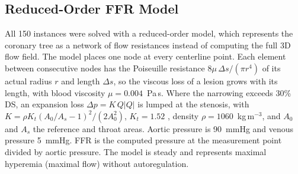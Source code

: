\documentclass[journal,twoside,web]{ieeecolor}
\begin{document}
\subsection{Reduced-Order FFR Model}
All 150 instances were solved with a reduced-order model, which represents the coronary tree as a network of flow
resistances instead of computing the full 3D flow field. The model places one node at every centerline point. Each element between consecutive nodes has the Poiseuille
resistance $8\mu\,\Delta s/(\pi r^4)$ of its actual radius $r$ and length $\Delta s$, so the viscous loss of a lesion grows with its length, with blood viscosity
$\mu = 0.004$~Pa\,s. Where the narrowing exceeds 30\% DS, an expansion loss $\Delta p = K\,Q|Q|$ is lumped at the
stenosis, with $K = \rho K_t (A_0/A_s - 1)^2 / (2A_0^2)$, $K_t = 1.52$ \cite{young1973}, density
$\rho = 1060$~kg\,m$^{-3}$, and $A_0$ and $A_s$ the reference and throat areas. Aortic pressure is 90~mmHg and
venous pressure 5~mmHg. FFR is the computed
pressure at the measurement point divided by aortic pressure. The model is steady and represents maximal hyperemia
(maximal flow) without autoregulation.
\end{document}
